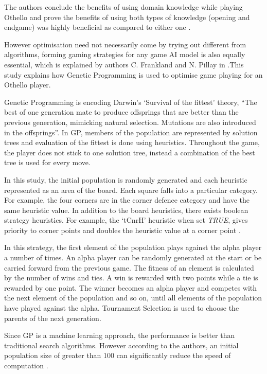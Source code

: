 \documentclass{svproc}
\begin{document}
The authors conclude the benefits of using domain knowledge while playing Othello and prove the benefits of using both types of knowledge (opening and endgame) was highly beneficial as compared to either one \cite{esmond_2}.

However optimisation need not necessarily come by trying out different from algorithms, forming gaming strategies for any game AI model is also equally essential, which is explained by authors C. Frankland and N. Pillay in \cite{hema_1}.This study explains how Genetic Programming is used to optimise game playing for an Othello player.

Genetic Programming is encoding Darwin’s ‘Survival of the fittest’ theory,  “The best of one generation mate to produce offsprings that are better than the previous generation, mimicking natural selection. Mutations are also introduced in the offsprings”. In GP, members of the population are represented by solution trees and evaluation of the fittest is done using heuristics. Throughout the game, the player does not stick to one solution tree, instead a combination of the best tree is used for every move.

In this study, the initial population is randomly generated and each heuristic represented as an area of the board. Each square falls into a particular category. For example, the four corners are in the corner defence category and have the same heuristic value. In addition to the board heuristics, there exists boolean strategy heuristics. For example, the ‘tCnrH’ heuristic when set \emph{TRUE}, gives priority to corner points and doubles the heuristic value at a corner point \cite{hema_1}.

In this strategy, the first element of the population plays against the alpha player a number of times. An alpha player can be randomly generated at the start or be carried forward from the previous game. The fitness of an element is calculated by the number of wins and ties. A win is rewarded with two points while a tie is rewarded by one point. The winner becomes an alpha player and competes with the next element of the population and so on, until all elements of the population have played against the alpha. Tournament Selection is used to choose the parents of the next generation.

Since GP is a machine learning approach, the performance is better than traditional search algorithms. However according to the authors, an initial population size of greater than 100 can significantly reduce the speed of computation \cite{hema_1}.
\end{document}
